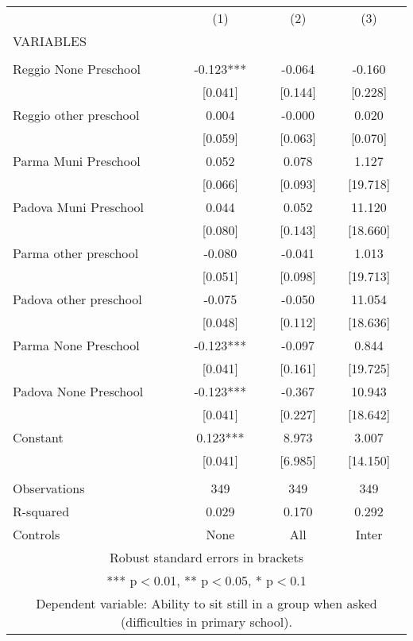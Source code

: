 \begin{tabular}{lccc} \hline
 & (1) & (2) & (3) \\
VARIABLES &  &  &  \\ \hline
 &  &  &  \\
Reggio None Preschool & -0.123*** & -0.064 & -0.160 \\
 & [0.041] & [0.144] & [0.228] \\
Reggio other preschool & 0.004 & -0.000 & 0.020 \\
 & [0.059] & [0.063] & [0.070] \\
Parma Muni Preschool & 0.052 & 0.078 & 1.127 \\
 & [0.066] & [0.093] & [19.718] \\
Padova Muni Preschool & 0.044 & 0.052 & 11.120 \\
 & [0.080] & [0.143] & [18.660] \\
Parma other preschool & -0.080 & -0.041 & 1.013 \\
 & [0.051] & [0.098] & [19.713] \\
Padova other preschool & -0.075 & -0.050 & 11.054 \\
 & [0.048] & [0.112] & [18.636] \\
Parma None Preschool & -0.123*** & -0.097 & 0.844 \\
 & [0.041] & [0.161] & [19.725] \\
Padova None Preschool & -0.123*** & -0.367 & 10.943 \\
 & [0.041] & [0.227] & [18.642] \\
Constant & 0.123*** & 8.973 & 3.007 \\
 & [0.041] & [6.985] & [14.150] \\
 &  &  &  \\
Observations & 349 & 349 & 349 \\
R-squared & 0.029 & 0.170 & 0.292 \\
 Controls & None & All & Inter \\ \hline
\multicolumn{4}{c}{ Robust standard errors in brackets} \\
\multicolumn{4}{c}{ *** p$<$0.01, ** p$<$0.05, * p$<$0.1} \\
\multicolumn{4}{c}{ Dependent variable: Ability to sit still in a group when asked (difficulties in primary school).} \\
\end{tabular}
